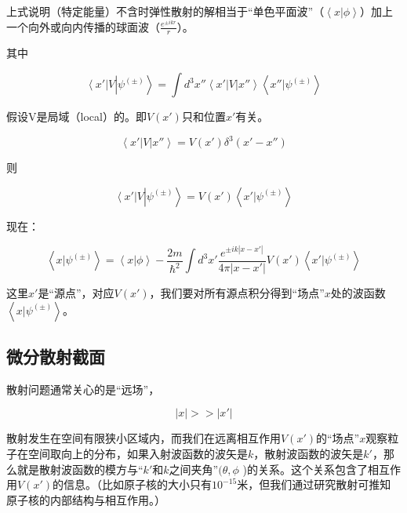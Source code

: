 上式说明（特定能量）不含时弹性散射的解相当于“单色平面波”（$\left\langle x | \phi \right\rangle$）加上一个向外或向内传播的球面波（$\frac{e^{\pm i k  r}}{r }$）。

其中

\begin{equation}
\left\langle x' \right| V \left| \psi^{(\pm)} \right\rangle = \int d^3 x'' \left\langle x' \right| V \left| x'' \right\rangle \left\langle x'' | \psi^{(\pm)} \right\rangle
\end{equation}

假设V是局域（local）的。即$V(x')$只和位置$x'$有关。

\begin{equation}
\left\langle x' \right| V \left| x'' \right\rangle = V(x' ) \delta^3 (x' -x'')
\end{equation}

则

\begin{equation}
\left\langle x' \right| V \left| \psi^{(\pm)} \right\rangle = V(x') \left\langle x' | \psi^{(\pm)} \right\rangle
\end{equation}

现在：

\begin{equation}
\left\langle x | \psi^{(\pm)} \right\rangle = \left\langle x | \phi \right\rangle - \frac{2m}{\hbar^2} \int d^3 x' \frac{e^{\pm i k |x-x'|}}{4 \pi |x-x'| } V(x') \left\langle x' | \psi^{(\pm)} \right\rangle 
\end{equation}

这里$x'$是“源点”，对应$V(x')$，我们要对所有源点积分得到“场点”$x$处的波函数$\left\langle x | \psi^{(\pm)} \right\rangle$。

\subsection{微分散射截面}

散射问题通常关心的是“远场”，

\begin{equation}
|x| >> |x'|
\end{equation}

散射发生在空间有限狭小区域内，而我们在远离相互作用$V(x')$的“场点”$x$观察粒子在空间取向上的分布，如果入射波函数的波矢是$k$，散射波函数的波矢是$k'$，那么就是散射波函数的模方与“$k'$和$k$之间夹角”$( \theta, \phi$ )的关系。这个关系包含了相互作用$V(x')$的信息。（比如原子核的大小只有$10^{-15}$米，但我们通过研究散射可推知原子核的内部结构与相互作用。）

